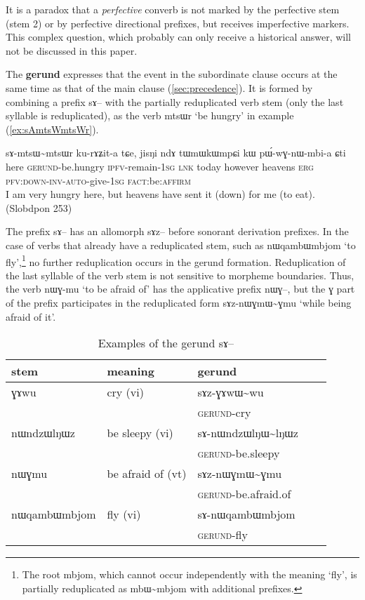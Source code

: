 \documentclass[oldfontcommands,oneside,a4paper,11pt]{article}
\newcommand{\ipa}[1]{{\phon \mbox{#1}}} %
\newcommand{\refb}[1]{(\ref{#1})}
\begin{document}
It is a paradox that a \textit{perfective}  converb is not marked by the perfective stem (stem 2) or by perfective directional prefixes, but receives imperfective markers. This complex question, which probably can only receive a historical answer, will not be discussed in this paper.

The \textbf{gerund}   expresses that the event in the subordinate clause occurs at the same time as that of the main clause \refb{sec:precedence}. It is formed by combining a prefix  \ipa{sɤ}-- with the partially reduplicated verb stem (only the last syllable is reduplicated), as the verb \ipa{mtsɯr} `be hungry' in example \refb{ex:sAmtsWmtsWr}.

\begin{exe}
\ex \label{ex:sAmtsWmtsWr}
\gll  \ipa{kutɕu}  	\ipa{sɤ-mtsɯ\textasciitilde{}mtsɯr}  	\ipa{ku-rɤʑit-a}  	\ipa{tɕe,}  	\ipa{jisŋi}  	\ipa{ndɤ}  	\ipa{tɯmɯkɯmpɕi}  	\ipa{kɯ}  	\ipa{pɯ́-wɣ-nɯ-mbi-a}  	\ipa{ɕti}  \\
 here \textsc{gerund}-be.hungry \textsc{ipfv}-remain-\textsc{1sg} \textsc{lnk} today however heavens \textsc{erg} \textsc{pfv:down-inv-auto}-give-\textsc{1sg} \textsc{fact}:be:\textsc{affirm} \\
\glt I am very hungry here, but heavens have sent it (down) for  me (to eat). (Slobdpon 253)
\end{exe}

The prefix \ipa{sɤ}-- has an allomorph \ipa{sɤz}-- before sonorant derivation prefixes.  In the case of verbs that already have a reduplicated stem, such as \ipa{nɯqambɯmbjom} `to fly',\footnote{The root \ipa{mbjom}, which cannot occur independently with the meaning `fly', is partially reduplicated as \ipa{mbɯ\textasciitilde{}mbjom} with additional prefixes.} no further reduplication occurs in the gerund formation. Reduplication of the last syllable of the verb stem is not sensitive to morpheme boundaries. Thus, the verb \ipa{nɯɣ-mu} `to be afraid of' has the applicative prefix \ipa{nɯɣ}--, but the \ipa{ɣ} part of the prefix participates in the reduplicated form \ipa{sɤz-nɯɣmɯ\textasciitilde{}ɣmu} `while being afraid of it'.

\begin{table}[h]
\caption{Examples of the gerund \ipa{sɤ}--} \label{tab:gerund}
\begin{tabular}{lllll}
\toprule
stem & meaning & gerund \\
\midrule
\ipa{ɣɤwu}& cry (vi)& \ipa{sɤz-ɣɤwɯ\textasciitilde{}wu}\\
&&\textsc{gerund}-cry \\
\ipa{nɯndzɯlŋɯz}& be sleepy (vi)& \ipa{sɤ-nɯndzɯlŋɯ\textasciitilde{}lŋɯz}\\
&&\textsc{gerund}-be.sleepy \\
\ipa{nɯɣmu}& be afraid of (vt)& \ipa{sɤz-nɯɣmɯ\textasciitilde{}ɣmu}\\
&&\textsc{gerund}-be.afraid.of \\
\midrule
\ipa{nɯqambɯmbjom} & fly (vi) &\ipa{sɤ-nɯqambɯmbjom} \\
&&\textsc{gerund}-fly \\
\bottomrule
\end{tabular}
\end{table}
\end{document}
